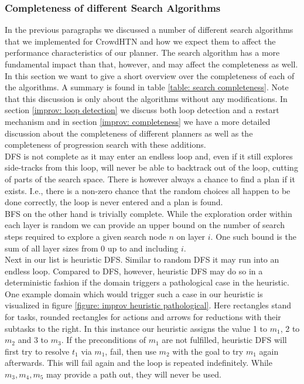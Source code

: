 \subsubsection{Completeness of different Search Algorithms}
\label{improv: search completeness}
In the previous paragraphs we discussed a number of different search algorithms that we implemented for CrowdHTN and how we expect them to affect the performance characteristics of our planner. The search algorithm has a more fundamental impact than that, however, and may affect the completeness as well. In this section we want to give a short overview over the completeness of each of the algorithms. A summary is found in table \ref{table: search completeness}. Note that this discussion is only about the algorithms without any modifications. In section \ref{improv: loop detection} we discuss both loop detection and a restart mechanism and in section \ref{improv: completeness} we have a more detailed discussion about the completeness of different planners as well as the completeness of progression search with these additions. \\
DFS is not complete as it may enter an endless loop and, even if it still explores side-tracks from this loop, will never be able to backtrack out of the loop, cutting of parts of the search space. There is however always a chance to find a plan if it exists. I.e., there is a non-zero chance that the random choices all happen to be done correctly, the loop is never entered and a plan is found. \\
BFS on the other hand is trivially complete. While the exploration order within each layer is random we can provide an upper bound on the number of search steps required to explore a given search node $n$ on layer $i$. One such bound is the sum of all layer sizes from 0 up to and including $i$. \\
Next in our list is heuristic DFS. Similar to random DFS it may run into an endless loop. Compared to DFS, however, heuristic DFS may do so in a deterministic fashion if the domain triggers a pathological case in the heuristic. One example domain which would trigger such a case in our heuristic is visualized in figure \ref{figure: improv heuristic pathological}. 
Here rectangles stand for tasks, rounded rectangles for actions and arrows for reductions with their subtasks to the right.
In this instance our heuristic assigns the value 1 to $m_1$, 2 to $m_2$ and 3 to $m_3$. If the preconditions of $m_1$ are not fulfilled, heuristic DFS will first try to resolve $t_1$ via $m_1$, fail, then use $m_2$ with the goal to try $m_1$ again afterwards. This will fail again and the loop is repeated indefinitely. While $m_3, m_4, m_5$ may provide a path out, they will never be used. \\ 
